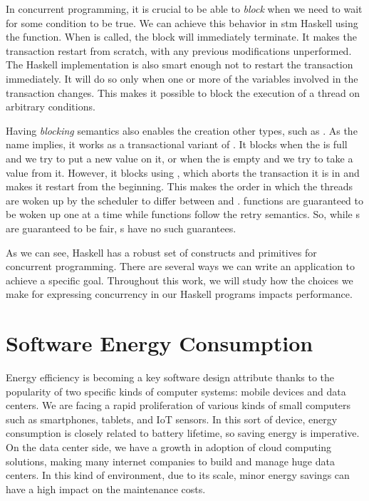 In concurrent programming, it is crucial to be able to \emph{block} when we need to wait for some condition to be true. We can achieve this behavior in \acs{stm} Haskell using the \retry function. When \retry is called, the \atomically block will immediately terminate. It makes the transaction restart from scratch, with any previous modifications unperformed. The Haskell implementation is also smart enough not to restart the transaction immediately. It will do so only when one or more of the variables involved in the transaction changes. This makes it possible to block the execution of a thread on arbitrary conditions.

Having \emph{blocking} semantics also enables the creation other types, such as \TMVar. As the name implies, it works as a transactional variant of \MVar. It blocks when the \TMVar is full and we try to put a new value on it, or when the \TMVar is empty and we try to take a value from it. However, it blocks using \retry, which aborts the transaction it is in and makes it restart from the beginning. This makes the order in which the threads are woken up by the scheduler to differ between \MVar and \TMVar. \MVar functions are guaranteed to be woken up one at a time while \TMVar functions follow the retry semantics. So, while {\MVar}s are guaranteed to be fair, {\TMVar}s have no such guarantees.

As we can see, Haskell has a robust set of constructs and primitives for concurrent programming. There are several ways we can write an application to achieve a specific goal. Throughout this work, we will study how the choices we make for expressing concurrency in our Haskell programs impacts performance.


\section{Software Energy Consumption}
Energy efficiency is becoming a key software design attribute thanks to the popularity of two specific kinds of computer systems: mobile devices and data centers. We are facing a rapid proliferation of various kinds of small computers such as smartphones, tablets, and IoT sensors. In this sort of device, energy consumption is closely related to battery lifetime, so saving energy is imperative. On the data center side, we have a growth in adoption of cloud computing solutions, making many internet companies to build and manage huge data centers. In this kind of environment, due to its scale, minor energy savings can have a high impact on the maintenance costs.


